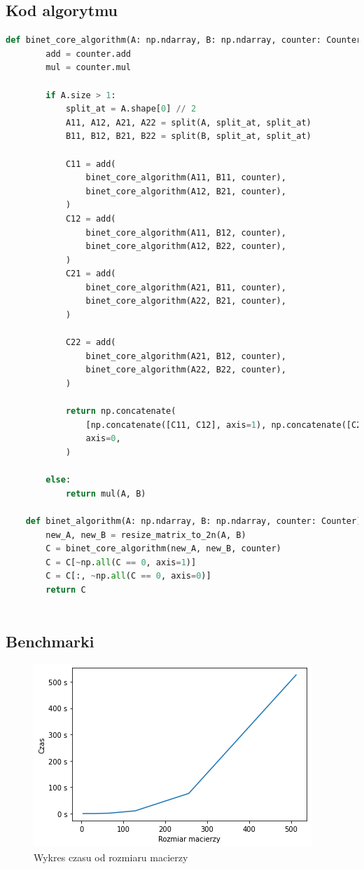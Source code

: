\documentclass[12pt,a4paper,table]{article}
\begin{document}
    \subsection{Kod algorytmu}
    \begin{lstlisting}[language=Python]
        def binet_core_algorithm(A: np.ndarray, B: np.ndarray, counter: Counter) -> np.ndarray:
        add = counter.add
        mul = counter.mul
        
        if A.size > 1:
            split_at = A.shape[0] // 2
            A11, A12, A21, A22 = split(A, split_at, split_at)
            B11, B12, B21, B22 = split(B, split_at, split_at)

            C11 = add(
                binet_core_algorithm(A11, B11, counter),
                binet_core_algorithm(A12, B21, counter),
            )
            C12 = add(
                binet_core_algorithm(A11, B12, counter),
                binet_core_algorithm(A12, B22, counter),
            )     
            C21 = add(
                binet_core_algorithm(A21, B11, counter),
                binet_core_algorithm(A22, B21, counter),
            )
            
            C22 = add(
                binet_core_algorithm(A21, B12, counter),
                binet_core_algorithm(A22, B22, counter),
            )

            return np.concatenate(
                [np.concatenate([C11, C12], axis=1), np.concatenate([C21, C22], axis=1)],
                axis=0,
            )
        
        else:
            return mul(A, B)

    def binet_algorithm(A: np.ndarray, B: np.ndarray, counter: Counter) -> np.ndarray:
        new_A, new_B = resize_matrix_to_2n(A, B)
        C = binet_core_algorithm(new_A, new_B, counter)
        C = C[~np.all(C == 0, axis=1)]
        C = C[:, ~np.all(C == 0, axis=0)]
        return C
    
    \end{lstlisting}

    \subsection{Benchmarki}

    \begin{figure}[H]
        \centering
        \includegraphics[width=0.6\linewidth]{img/binet_times.png}
        \caption{Wykres czasu od rozmiaru macierzy}
        \label{fig:binet_times}
    \end{figure}
\end{document}
